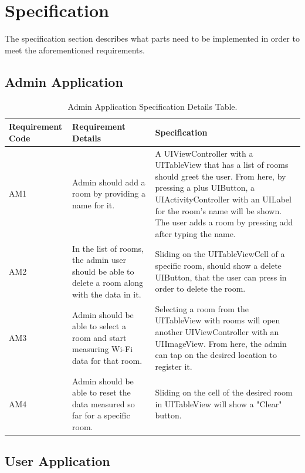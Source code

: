 \newpage
\section{Specification}
The specification section describes what parts need to be implemented in order to meet the aforementioned requirements.

\subsection{Admin Application}

\setlength\tabcolsep{4pt}
\begin{longtable}[c]{| p{2cm} | p{5cm} | p{5cm} |}
\caption{Admin Application Specification Details Table.\label{long}}\\
 
\hline
Requirement Code & Requirement Details & Specification \\
\hline 
\endhead

\hline
\endlastfoot

AM1 & Admin should add a room by providing a name for it. & A UIViewController with a UITableView that has a list of rooms should greet the user.
From here, by pressing a plus UIButton, a UIActivityController with
an UILabel for the room's name will be shown. The user adds a room by pressing add after typing the name.\\
\hline
AM2 & In the list of rooms, the admin user should be able to delete a room along with the data in it. & Sliding on the UITableViewCell of a specific room, should show a delete UIButton, that the user can press in order to delete the room.\\
\hline
AM3 & Admin should be able to select a room and start measuring
 Wi-Fi data for that room. & Selecting a room from the UITableView with rooms will open another UIViewController
with an UIImageView. From here, the admin can tap on the desired location to register it.\\
\hline
AM4 & Admin should be able to reset the data measured so far for
 a specific room. & Sliding on the cell of the desired room in UITableView will show a "Clear" button.\\
\end{longtable}
\newpage

\subsection{User Application}

